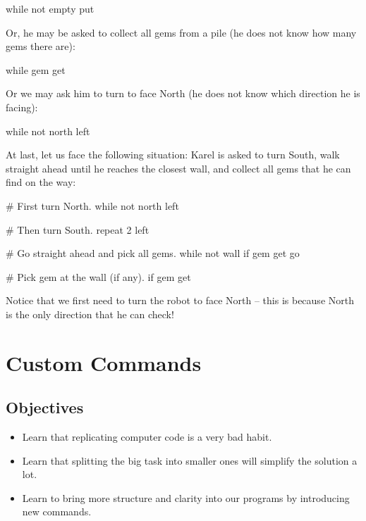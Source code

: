 \begin{bluecode}
while not empty
    put
\end{bluecode}
Or, he may be asked to collect all gems from a pile (he does not know 
how many gems there are):

\begin{bluecode}
while gem
    get
\end{bluecode}
Or we may ask him to turn to face North (he does not know which direction he is
facing):

\begin{bluecode}
while not north
    left
\end{bluecode}
At last, let us face the following situation: Karel is asked to 
turn South, walk straight ahead until he reaches the closest wall, and 
collect all gems that he can find on the way:

\begin{bluecode}
# First turn North.
while not north
    left

# Then turn South.
repeat 2
    left

# Go straight ahead and pick all gems.
while not wall
    if gem
        get
    go

# Pick gem at the wall (if any).
if gem
    get
\end{bluecode}
Notice that we first need to turn the robot to face North -- this is because North 
is the only direction that he can check!



\section{Custom Commands} \label{sec:newcom}

\subsection{Objectives} 
 
\begin{itemize}
\item Learn that replicating computer code is a very bad habit.
\item Learn that splitting the big task into smaller ones will simplify the solution a lot. 
\item Learn to bring more structure and clarity into our programs by introducing new commands.
\end{itemize}

